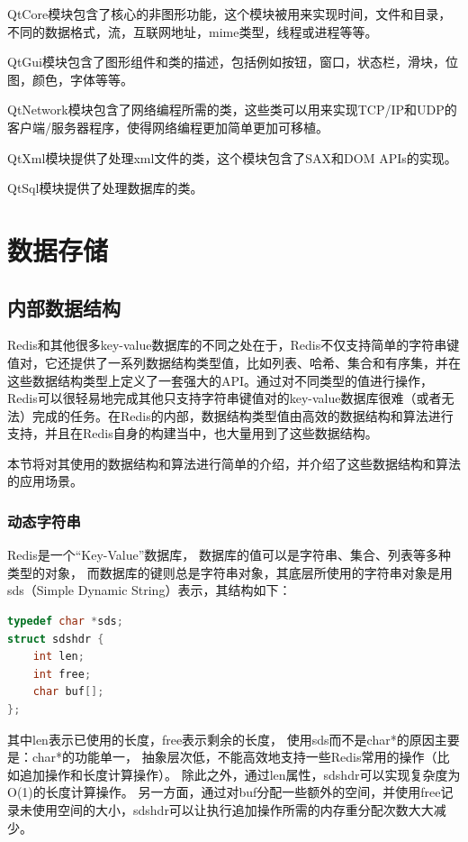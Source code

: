 \documentclass{zjutthesis}
\begin{document}
QtCore模块包含了核心的非图形功能，这个模块被用来实现时间，文件和目录，不同的数据格式，流，互联网地址，mime类型，线程或进程等等。

QtGui模块包含了图形组件和类的描述，包括例如按钮，窗口，状态栏，滑块，位图，颜色，字体等等。

QtNetwork模块包含了网络编程所需的类，这些类可以用来实现TCP/IP和UDP的客户端/服务器程序，使得网络编程更加简单更加可移植。

QtXml模块提供了处理xml文件的类，这个模块包含了SAX和DOM APIs的实现。

QtSql模块提供了处理数据库的类。


\chapter{数据存储}
\section{内部数据结构}
Redis和其他很多key-value数据库的不同之处在于，Redis不仅支持简单的字符串键值对，它还提供了一系列数据结构类型值，比如列表、哈希、集合和有序集，并在这些数据结构类型上定义了一套强大的API。通过对不同类型的值进行操作，Redis可以很轻易地完成其他只支持字符串键值对的key-value数据库很难（或者无法）完成的任务。在Redis的内部，数据结构类型值由高效的数据结构和算法进行支持，并且在Redis自身的构建当中，也大量用到了这些数据结构。

本节将对其使用的数据结构和算法进行简单的介绍，并介绍了这些数据结构和算法的应用场景。

\subsection{动态字符串}
Redis是一个“Key-Value”数据库， 数据库的值可以是字符串、集合、列表等多种类型的对象， 而数据库的键则总是字符串对象，其底层所使用的字符串对象是用sds（Simple Dynamic String）表示，其结构如下：
\begin{lstlisting}[language=C]
typedef char *sds;
struct sdshdr {
    int len;
    int free;
    char buf[];
};
\end{lstlisting}
其中len表示已使用的长度，free表示剩余的长度，
使用sds而不是char*的原因主要是：char*的功能单一， 抽象层次低，不能高效地支持一些Redis常用的操作（比如追加操作和长度计算操作）。
除此之外，通过len属性，sdshdr可以实现复杂度为O(1)的长度计算操作。
另一方面，通过对buf分配一些额外的空间，并使用free记录未使用空间的大小，sdshdr可以让执行追加操作所需的内存重分配次数大大减少。
\end{document}
